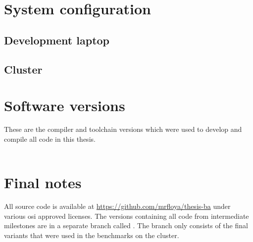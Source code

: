 \glsaddall
\printglossaries

\chapter{System configuration}
\label{ap:Configuration}

\section*{Development laptop}
\label{ap:Configuration::Laptop}





\section*{Cluster}
\label{ap:Configuration::Cluster}





\chapter{Software versions}
\label{ap:Versions}

These are the compiler and toolchain versions which were used to develop and compile all code in this thesis.
\\ \\








\chapter{Final notes}
\label{ap:notes}

All source code is available at \url{https://github.com/mrfloya/thesis-ba} under various \gls{osi} approved licenses. The versions containing all code from intermediate milestones are in a separate branch called . The  branch only consists of the final variants that were used in the benchmarks on the cluster.
